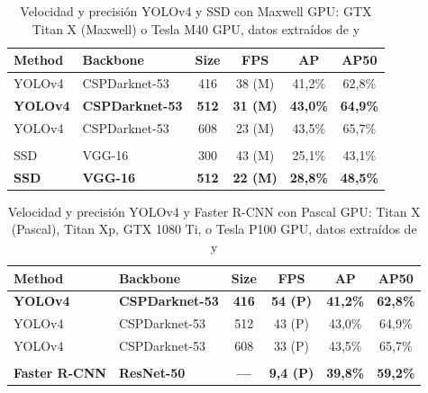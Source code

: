 \begin{table}[ht]
\centering
\caption{Velocidad y precisión YOLOv4 y SSD con Maxwell GPU: GTX Titan X (Maxwell) o Tesla M40 GPU, datos extraídos de \cite{bochkovskiy2020yolov4} y \cite{Liu_2016}}
\label{tab:maxwell-speed-accuracy}
\begin{tabular}{llcccc}
\hline
\textbf{Method} & \textbf{Backbone}      & \textbf{Size} & \textbf{FPS}    & \textbf{AP}     & \textbf{AP50}   \\ \hline
YOLOv4          & CSPDarknet-53          & 416           & 38 (M)          & 41,2\%          & 62,8\%          \\
\textbf{YOLOv4} & \textbf{CSPDarknet-53} & \textbf{512}  & \textbf{31 (M)} & \textbf{43,0\%} & \textbf{64,9\%} \\
YOLOv4          & CSPDarknet-53          & 608           & 23 (M)          & 43,5\%          & 65,7\%          \\
                &                        &               &                 &                 &                 \\
SSD             & VGG-16                 & 300           & 43 (M)          & 25,1\%          & 43,1\%          \\
\textbf{SSD}    & \textbf{VGG-16}        & \textbf{512}  & \textbf{22 (M)} & \textbf{28,8\%} & \textbf{48,5\%} \\ \hline
\end{tabular}
\end{table}

\begin{table}[ht]
\centering
\caption{Velocidad y precisión YOLOv4 y Faster R-CNN con Pascal GPU: Titan X (Pascal), Titan Xp, GTX 1080 Ti, o Tesla P100 GPU, datos extraídos de \cite{bochkovskiy2020yolov4} y \cite{ren2016faster}}
\label{tab:pascal-speed-accuracy}
\begin{tabular}{llcccc}
\hline
\textbf{Method}       & \textbf{Backbone}      & \textbf{Size} & \textbf{FPS}     & \textbf{AP}     & \textbf{AP50}   \\ \hline
\textbf{YOLOv4}       & \textbf{CSPDarknet-53} & \textbf{416}  & \textbf{54 (P)}  & \textbf{41,2\%} & \textbf{62,8\%} \\
YOLOv4                & CSPDarknet-53          & 512           & 43 (P)           & 43,0\%          & 64,9\%          \\
YOLOv4                & CSPDarknet-53          & 608           & 33 (P)           & 43,5\%          & 65,7\%          \\
                      &                        &               &                  &                 &                 \\
\textbf{Faster R-CNN} & \textbf{ResNet-50}     & \textbf{—}    & \textbf{9,4 (P)} & \textbf{39,8\%} & \textbf{59,2\%} \\ \hline
\end{tabular}
\end{table}


